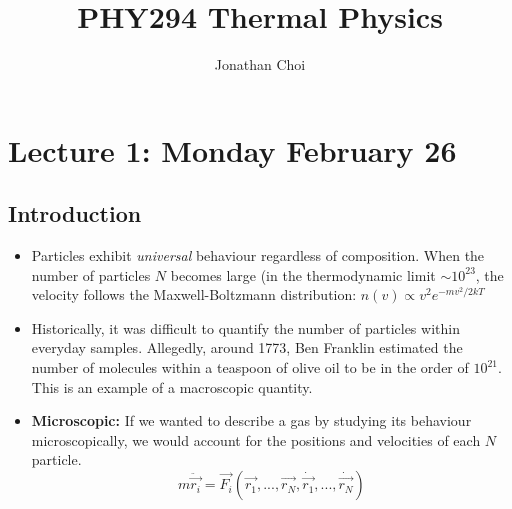 \documentclass[8pt]{article}
\title{PHY294 Thermal Physics}
\author{Jonathan Choi}
\date{}
\begin{document}
\maketitle


\section{Lecture 1: Monday February 26}
\subsection{Introduction}
\begin{itemize}
    \item Particles exhibit \textit{universal} behaviour regardless of composition. When the number of particles $N$ becomes large (in the thermodynamic limit $\sim 10^{23}$, the velocity follows the Maxwell-Boltzmann distribution: $n(v) \propto v^2 e^{-mv^2/2kT}$ 
    \item Historically, it was difficult to quantify the number of particles within everyday samples. Allegedly, around 1773, Ben Franklin estimated the number of molecules within a teaspoon of olive oil to be in the order of $10^{21}$. This is an example of a macroscopic quantity. 
    \item \textbf{Microscopic:} If we wanted to describe a gas by studying its behaviour microscopically, we would account for the positions and velocities of each $N$ particle. 
    \begin{equation} 
    m \ddot{\vec{r_i}} = \vec{F_{i}}(\vec{r_1}, ... , \vec{r_N}, \dot{\vec{r_1}}, ... , \dot{\vec{r_N}}) 
\end{equation}
    

\end{itemize}
\end{document}
